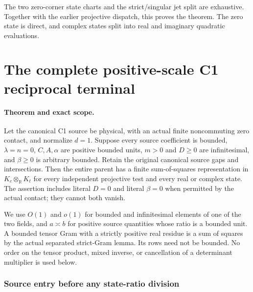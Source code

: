 The two zero-corner state charts and the strict/singular jet split
are exhaustive. Together with the earlier projective dispatch, this
proves the theorem. The zero state is direct, and complex states split
into real and imaginary quadratic evaluations.



\section{\texorpdfstring{The complete positive-scale C1 reciprocal terminal}{The complete positive-scale C1 reciprocal terminal}}
\label{component:p98f24864b071}

\label{p98f24864b071:sec:c1-reciprocal-rederived}

\paragraph{Theorem and exact scope.}
Let the canonical C1 source be physical, with an actual finite
noncommuting zero contact, and normalize $d=1$. Suppose every source
coefficient is bounded, $\lambda=n=0$, $C,A,\alpha$ are positive
bounded units, $m>0$ and $D\geq0$ are infinitesimal, and
$\beta\geq0$ is arbitrary bounded. Retain the original canonical
source gaps and intersections. Then the entire parent has a finite
sum-of-squares representation in $K_c\otimes_{\mathbb R}K_t$ for
every independent projective test and every real or complex state.
The assertion includes literal $D=0$ and literal $\beta=0$ when
permitted by the actual contact; they cannot both vanish.

We use $O(1)$ and $o(1)$ for bounded and infinitesimal elements of
one of the two fields, and $a\asymp b$ for positive source quantities
whose ratio is a bounded unit. A bounded tensor Gram with a strictly
positive real residue is a sum of squares by the actual separated
strict-Gram lemma. Its rows need not be bounded. No order on the tensor
product, mixed inverse, or cancellation of a determinant multiplier is
used below.

\subsubsection*{Source entry before any state-ratio division}

